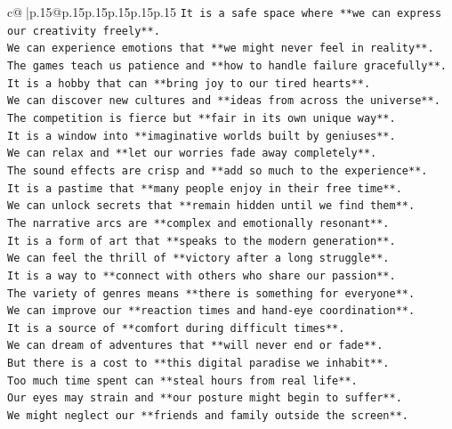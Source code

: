 \documentclass{article}
\begin{document}
{\begin{supertabular}{c@{$\;$}|p{.15\linewidth}@{}p{.15\linewidth}p{.15\linewidth}p{.15\linewidth}p{.15\linewidth}p{.15\linewidth}}
{{{\texttt{It is a safe space where **we can express our creativity freely**.} \\
\texttt{We can experience emotions that **we might never feel in reality**.} \\
\texttt{The games teach us patience and **how to handle failure gracefully**.} \\
\texttt{It is a hobby that can **bring joy to our tired hearts**.} \\
\texttt{We can discover new cultures and **ideas from across the universe**.} \\
\texttt{The competition is fierce but **fair in its own unique way**.} \\
\texttt{It is a window into **imaginative worlds built by geniuses**.} \\
\texttt{We can relax and **let our worries fade away completely**.} \\
\texttt{The sound effects are crisp and **add so much to the experience**.} \\
\texttt{It is a pastime that **many people enjoy in their free time**.} \\
\texttt{We can unlock secrets that **remain hidden until we find them**.} \\
\texttt{The narrative arcs are **complex and emotionally resonant**.} \\
\texttt{It is a form of art that **speaks to the modern generation**.} \\
\texttt{We can feel the thrill of **victory after a long struggle**.} \\
\texttt{It is a way to **connect with others who share our passion**.} \\
\texttt{The variety of genres means **there is something for everyone**.} \\
\texttt{We can improve our **reaction times and hand{-}eye coordination**.} \\
\texttt{It is a source of **comfort during difficult times**.} \\
\texttt{We can dream of adventures that **will never end or fade**.} \\
\texttt{But there is a cost to **this digital paradise we inhabit**.} \\
\texttt{Too much time spent can **steal hours from real life**.} \\
\texttt{Our eyes may strain and **our posture might begin to suffer**.} \\
\texttt{We might neglect our **friends and family outside the screen**.} \\
}}}
\end{supertabular}}
\end{document}
